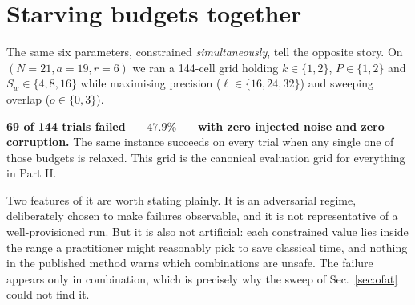 \section{Starving budgets together}
\label{sec:combined}

The same six parameters, constrained \emph{simultaneously}, tell the
opposite story. On $(N{=}21,a{=}19,r{=}6)$ we ran a 144-cell grid holding
$k\in\{1,2\}$, $P\in\{1,2\}$ and $S_w\in\{4,8,16\}$ while maximising
precision ($\ell\in\{16,24,32\}$) and sweeping overlap ($o\in\{0,3\}$).

\textbf{69 of 144 trials failed --- $47.9\%$ --- with zero injected noise and
zero corruption.} The same instance succeeds on every trial when any single
one of those budgets is relaxed. This grid is the canonical evaluation grid
for everything in Part II.

Two features of it are worth stating plainly. It is an adversarial regime,
deliberately chosen to make failures observable, and it is not
representative of a well-provisioned run. But it is also not artificial: each
constrained value lies inside the range a practitioner might reasonably pick
to save classical time, and nothing in the published method warns which
combinations are unsafe. The failure appears only in combination, which is
precisely why the sweep of Sec.~\ref{sec:ofat} could not find it.
